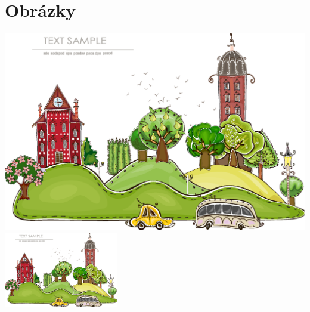 \documentclass[10pt,a4paper]{article}
\begin{document}
	\section{Obrázky}
	\label{obrazky}
		\includegraphics[scale=0.60]{Obrazek1.eps}
		\includegraphics[width=5cm, angle=-40]{Obrazek1.eps}
\end{document}
